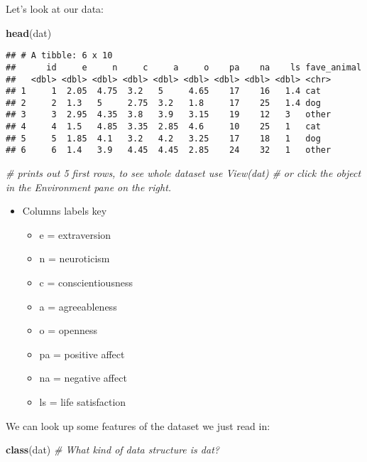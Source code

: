 \documentclass[
]{article}
\newenvironment{Shaded}{\begin{snugshade}}{\end{snugshade}}
\newcommand{\CommentTok}[1]{\textcolor[rgb]{0.56,0.35,0.01}{\textit{#1}}}
\newcommand{\FunctionTok}[1]{\textcolor[rgb]{0.13,0.29,0.53}{\textbf{#1}}}
\newcommand{\NormalTok}[1]{#1}
\providecommand{\tightlist}{%
  \setlength{\itemsep}{0pt}\setlength{\parskip}{0pt}}
\begin{document}
Let's look at our data:

\begin{Shaded}
\begin{Highlighting}[]
\FunctionTok{head}\NormalTok{(dat) }
\end{Highlighting}
\end{Shaded}

\begin{verbatim}
## # A tibble: 6 x 10
##      id     e     n     c     a     o    pa    na    ls fave_animal
##   <dbl> <dbl> <dbl> <dbl> <dbl> <dbl> <dbl> <dbl> <dbl> <chr>      
## 1     1  2.05  4.75  3.2   5     4.65    17    16   1.4 cat        
## 2     2  1.3   5     2.75  3.2   1.8     17    25   1.4 dog        
## 3     3  2.95  4.35  3.8   3.9   3.15    19    12   3   other      
## 4     4  1.5   4.85  3.35  2.85  4.6     10    25   1   cat        
## 5     5  1.85  4.1   3.2   4.2   3.25    17    18   1   dog        
## 6     6  1.4   3.9   4.45  4.45  2.85    24    32   1   other
\end{verbatim}

\begin{Shaded}
\begin{Highlighting}[]
\CommentTok{\# prints out 5 first rows, to see whole dataset use View(dat) }
\CommentTok{\# or click the object in the Environment pane on the right.}
\end{Highlighting}
\end{Shaded}

\begin{itemize}
\tightlist
\item
  Columns labels key

  \begin{itemize}
  \tightlist
  \item
    e = extraversion
  \item
    n = neuroticism
  \item
    c = conscientiousness
  \item
    a = agreeableness
  \item
    o = openness
  \item
    pa = positive affect
  \item
    na = negative affect
  \item
    ls = life satisfaction
  \end{itemize}
\end{itemize}

We can look up some features of the dataset we just read in:

\begin{Shaded}
\begin{Highlighting}[]
\FunctionTok{class}\NormalTok{(dat) }\CommentTok{\# What kind of data structure is dat? }
\end{Highlighting}
\end{Shaded}
\end{document}
